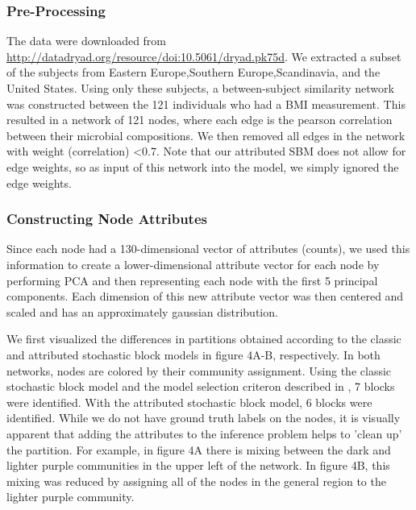 \subsubsection{Pre-Processing}
The data were downloaded from \url{http://datadryad.org/resource/doi:10.5061/dryad.pk75d}. We extracted a subset of the subjects from Eastern Europe,Southern Europe,Scandinavia, and the United States. Using only these subjects, a between-subject similarity network was constructed between the 121 individuals who had a BMI measurement. This resulted in a network of 121 nodes, where each edge is the pearson correlation between their microbial compositions. We then removed all edges in the network with weight (correlation) <0.7. Note that our attributed SBM does not allow for edge weights, so as input of this network into the model, we simply ignored the edge weights. 

\subsubsection{Constructing Node Attributes}
Since each node had a 130-dimensional vector of attributes (counts), we used this information to create a lower-dimensional attribute vector for each node by performing PCA and then representing each node with the first 5 principal components. Each dimension of this new attribute vector was then centered and scaled and has an approximately gaussian distribution. 

We first visualized the differences in partitions obtained according to the classic and attributed stochastic block models in figure 4A-B, respectively. In both networks, nodes are colored by their community assignment. Using the classic stochastic block model and the model selection criteron described in \cite{dudin}, 7 blocks were identified. With the attributed stochastic block model, 6 blocks were identified. While we do not have ground truth labels on the nodes, it is visually apparent that adding the attributes to the inference problem helps to 'clean up' the partition. For example, in figure 4A there is mixing between the dark and lighter purple communities in the upper left of the network. In figure 4B, this mixing was reduced by assigning all of the nodes in the general region to the lighter purple community. 


